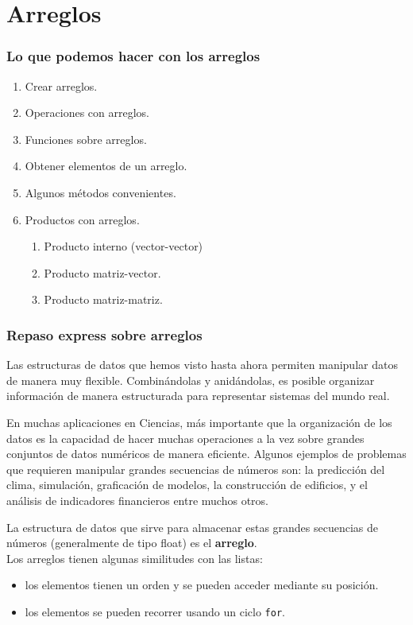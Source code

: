 \section{Arreglos}
\begin{frame}
\frametitle{Lo que podemos hacer con los arreglos}
\begin{enumerate}
\item Crear arreglos.
\item Operaciones con arreglos.
\item Funciones sobre arreglos.
\item Obtener elementos de un arreglo.
\item Algunos métodos convenientes.
\item Productos con arreglos.
\begin{enumerate}
\item Producto interno (vector-vector)
\item Producto matriz-vector.
\item Producto matriz-matriz.
\end{enumerate}
\end{enumerate}
\end{frame}
\begin{frame}
\frametitle{Repaso express sobre arreglos}
Las estructuras de datos que hemos visto hasta ahora permiten manipular datos de manera muy flexible. Combinándolas y anidándolas, es posible organizar información de manera estructurada para representar sistemas del mundo real.
\end{frame}
\begin{frame}
En muchas aplicaciones en Ciencias, más importante que la organización de los datos es la capacidad de hacer muchas operaciones a la vez sobre grandes conjuntos de datos numéricos de manera eficiente. Algunos ejemplos de problemas que requieren manipular grandes secuencias de números son: la predicción del clima, simulación, graficación de modelos, la construcción de edificios, y el análisis de indicadores financieros entre muchos otros.
\end{frame}
\begin{frame}
La estructura de datos que sirve para almacenar estas grandes secuencias de números (generalmente de tipo float) es el \textbf{arreglo}.
\\
\bigskip
Los arreglos tienen algunas similitudes con las listas:
\begin{itemize}
\item los elementos tienen un orden y se pueden acceder mediante su posición.
\item los elementos se pueden recorrer usando un ciclo \texttt{for}.
\end{itemize}
\end{frame}
